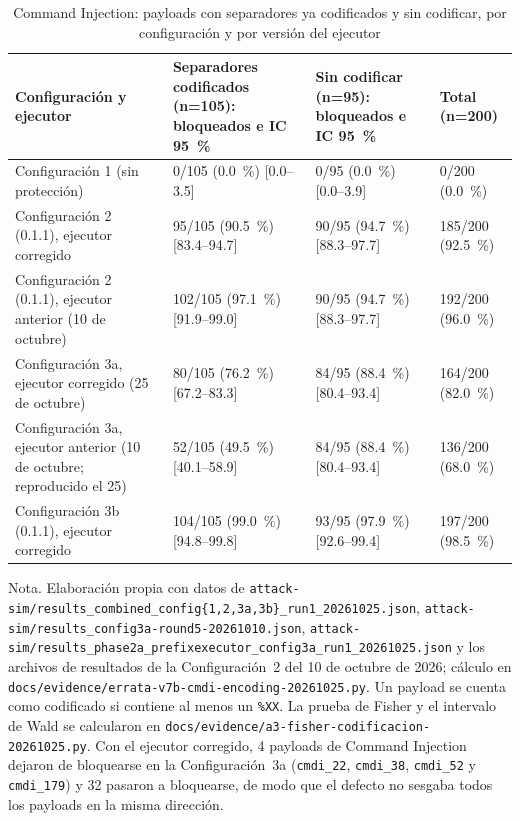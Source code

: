 \begin{table}[H]
\centering
\small
\begin{tabular}{|L{3.7cm}|L{3.6cm}|L{3.6cm}|L{2.5cm}|}
\hline
\textbf{Configuración y ejecutor} & \textbf{Separadores codificados (n=105): bloqueados e IC 95~\%} & \textbf{Sin codificar (n=95): bloqueados e IC 95~\%} & \textbf{Total (n=200)} \\ \hline
Configuración 1 (sin protección) & 0/105 (0.0~\%) [0.0--3.5] & 0/95 (0.0~\%) [0.0--3.9] & 0/200 (0.0~\%) \\ \hline
Configuración 2 (0.1.1), ejecutor corregido & 95/105 (90.5~\%) [83.4--94.7] & 90/95 (94.7~\%) [88.3--97.7] & 185/200 (92.5~\%) \\ \hline
Configuración 2 (0.1.1), ejecutor anterior (10 de octubre) & 102/105 (97.1~\%) [91.9--99.0] & 90/95 (94.7~\%) [88.3--97.7] & 192/200 (96.0~\%) \\ \hline
Configuración 3a, ejecutor corregido (25 de octubre) & 80/105 (76.2~\%) [67.2--83.3] & 84/95 (88.4~\%) [80.4--93.4] & 164/200 (82.0~\%) \\ \hline
Configuración 3a, ejecutor anterior (10 de octubre; reproducido el 25) & 52/105 (49.5~\%) [40.1--58.9] & 84/95 (88.4~\%) [80.4--93.4] & 136/200 (68.0~\%) \\ \hline
Configuración 3b (0.1.1), ejecutor corregido & 104/105 (99.0~\%) [94.8--99.8] & 93/95 (97.9~\%) [92.6--99.4] & 197/200 (98.5~\%) \\ \hline
\end{tabular}
\caption[Command Injection con separadores codificados y sin codificar]{Command Injection: payloads con separadores ya codificados y sin codificar, por configuración y por versión del ejecutor}
\label{tab:anx-cmdi-codificacion}
\end{table}
{\footnotesize Nota. Elaboración propia con datos de
\texttt{attack-sim/results\_combined\_config\{1,2,3a,3b\}\_run1\_20261025.json},
\texttt{attack-sim/results\_config3a-round5-20261010.json},
\texttt{attack-sim/results\_phase2a\_prefixexecutor\_config3a\_run1\_20261025.json} y los archivos
de resultados de la Configuración~2 del 10 de octubre de 2026; cálculo en
\texttt{docs/evidence/errata-v7b-cmdi-encoding-20261025.py}. Un payload se cuenta como codificado
si contiene al menos un \texttt{\%XX}. La prueba de Fisher y el intervalo de Wald se calcularon en
\texttt{docs/evidence/a3-fisher-codificacion-20261025.py}. Con el ejecutor corregido, 4 payloads de
Command Injection dejaron de bloquearse en la Configuración~3a (\texttt{cmdi\_22},
\texttt{cmdi\_38}, \texttt{cmdi\_52} y \texttt{cmdi\_179}) y 32 pasaron a bloquearse, de modo que el
defecto no sesgaba todos los payloads en la misma dirección.}

